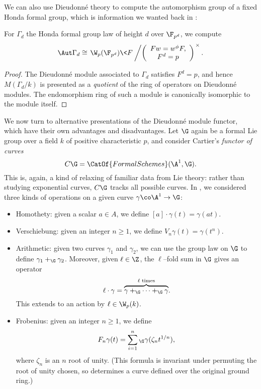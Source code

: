 We can also use Dieudonn\'e theory to compute the automorphism group of a fixed Honda formal group, which is information we wanted back in :

\begin{corollary}\label{FormOfStabilizerGroup}
For $\Gamma_d$ the Honda formal group law of height $d$ over $\F_{p^d}$, we compute \[\Aut \Gamma_d \cong \left. \W_p(\F_{p^d}) \<F\> \middle/ \left( \begin{array}{c} Fw = w^\phi F, \\ F^d = p \end{array} \right) \right.^\times.\]
\end{corollary}
\begin{proof}
The Dieudonn\'e module associated to $\Gamma_d$ satisfies $F^d = p$, and hence $M(\Gamma_d/k)$ is presented as a \emph{quotient} of the ring of operators on Dieudonn\'e modules.  The endomorphism ring of such a module is canonically isomorphic to the module itself.
\end{proof}

We now turn to alternative presentations of the Dieudonn\'e module functor, which have their own advantages and disadvantages.  Let $\G$ again be a formal Lie group over a field $k$ of positive characteristic $p$, and consider Cartier's \textit{functor of curves} \[C\G = \CatOf{FormalSchemes}(\A^1, \G).\]  This is, again, a kind of relaxing of familiar data from Lie theory: rather than studying exponential curves, $C\G$ tracks all possible curves.  In , we considered three kinds of operations on a given curve $\gamma\co \A^1 \to \G$:
\begin{itemize}
\item Homothety: given a scalar $a \in A$, we define $[a] \cdot \gamma(t) = \gamma(at)$.
\item Verschiebung: given an integer $n \ge 1$, we define $V_n \gamma(t) = \gamma(t^n)$.
\item Arithmetic: given two curves $\gamma_1$ and $\gamma_2$, we can use the group law on $\G$ to define $\gamma_1 +_{\G} \gamma_2$.  Moreover, given $\ell \in \Z$, the $\ell$--fold sum in $\G$ gives an operator \[\ell \cdot \gamma = \overset{\text{$\ell$ times}}{\overbrace{\gamma +_{\G} \cdots +_{\G} \gamma}}.\]  This extends to an action by $\ell \in \W_p(k)$.
\item Frobenius: given an integer $n \ge 1$, we define \[F_n \gamma(t) = \sum_{i=1}^n{}_{\G} \gamma(\zeta_n t^{1/n}),\] where $\zeta_{n}$ is an $n${\th} root of unity.  (This formula is invariant under permuting the root of unity chosen, so determines a curve defined over the original ground ring.)
\end{itemize}

